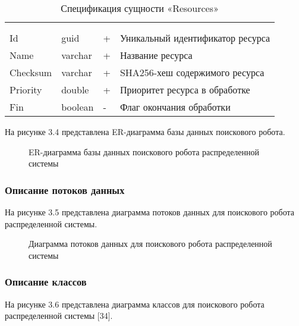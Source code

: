 \begin{xltabular}{\textwidth}{|X|X|X|X|}
	\caption{Спецификация сущности «Resources»}\label{crawler_resources:table}\\ \hline
	 &  &  &  \\ \hline
	 &  &  &  \\ \hline
	\endfirsthead
	 \hline
	 &  &  &  \\ \hline
	\endhead
	Id & guid & + & Уникальный идентификатор ресурса \\ \hline
	Name & varchar & + & Название ресурса \\ \hline
	Checksum & varchar & + & SHA256-хеш содержимого ресурса \\ \hline
	Priority & double & + & Приоритет ресурса в обработке \\ \hline
	Fin & boolean & - & Флаг окончания обработки \\ \hline
\end{xltabular}

На рисунке 3.4 представлена ER-диаграмма базы данных поискового робота.

\begin{figure}[H]
\caption{ER-диаграмма базы данных поискового робота распределенной системы}
\label{robot/robot_db:image}
\end{figure}

\subsubsection{Описание потоков данных}

На рисунке 3.5 представлена диаграмма потоков данных для поискового робота распределенной системы.

\begin{figure}[H]
\caption{Диаграмма потоков данных для поискового робота распределенной системы}
\label{robot/diagram_dataflow:image}
\end{figure}

\subsubsection{Описание классов}

На рисунке 3.6 представлена диаграмма классов для поискового робота распределенной системы [34].

